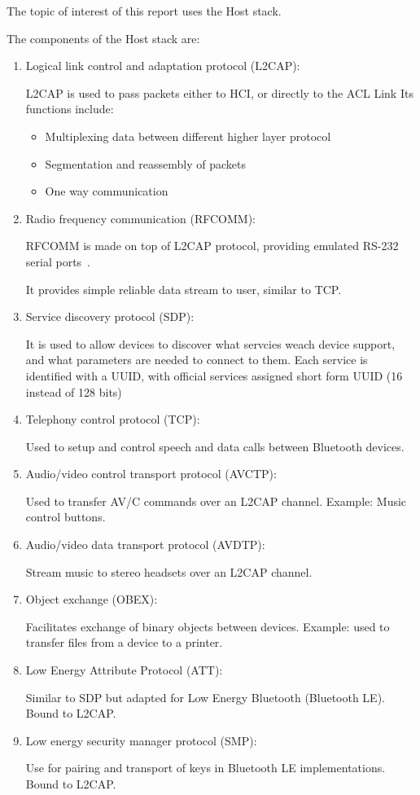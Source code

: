 \documentclass{article}
\theoremstyle{mytheoremstyle}
\theoremstyle{mytheoremstyle}
\theoremstyle{myproblemstyle}
\begin{document}
The topic of interest of this report uses the Host stack.

The components of the Host stack are:

\begin{enumerate}
  \item Logical link control and adaptation protocol (L2CAP):

    L2CAP is used to pass packets either to HCI, or directly to the ACL Link
    Its functions include:

    \begin{itemize}
      \item Multiplexing data between different higher layer protocol 
      \item Segmentation and reassembly of packets
      \item One way communication
    \end{itemize}

  \item Radio frequency communication (RFCOMM):

    RFCOMM is made on top of L2CAP protocol, providing emulated RS-232 serial ports~\cite{bt-specs}\cite{bt-arch}.

    It provides simple reliable data stream to user, similar to TCP.\@

  \item Service discovery protocol (SDP):

    It is used to allow devices to discover what servcies weach device support, and what parameters are needed to connect to them.
    Each service is identified with a UUID, with official services assigned short form UUID (16 instead of 128 bits)

  \item Telephony control protocol (TCP):

    Used to setup and control speech and data calls between Bluetooth devices.

  \item Audio/video control transport protocol (AVCTP):

    Used to transfer AV/C commands over an L2CAP channel. Example: Music control buttons.

  \item Audio/video data transport protocol (AVDTP):

    Stream music to stereo headsets over an L2CAP channel.

  \item Object exchange (OBEX):

    Facilitates exchange of binary objects between devices. Example: used to transfer files from a device to a printer.

  \item Low Energy Attribute Protocol (ATT):

    Similar to SDP but adapted for Low Energy Bluetooth (Bluetooth LE). Bound to L2CAP.\@

  \item Low energy security manager protocol (SMP):

    Use for pairing and transport of keys in Bluetooth LE implementations. Bound to L2CAP.\@
\end{enumerate}
\end{document}
